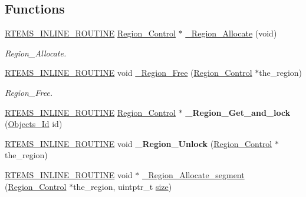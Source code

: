\subsection*{Functions}
\begin{DoxyCompactItemize}
\item 
\mbox{\hyperlink{group__RTEMSScoreBaseDefs_gac216239df231d5dbd15e3520b0b9313f}{R\+T\+E\+M\+S\+\_\+\+I\+N\+L\+I\+N\+E\+\_\+\+R\+O\+U\+T\+I\+NE}} \mbox{\hyperlink{structRegion__Control}{Region\+\_\+\+Control}} $\ast$ \mbox{\hyperlink{group__ClassicRegionImpl_gab5bc70b27378683bf2e2e4cdef8d7417}{\+\_\+\+Region\+\_\+\+Allocate}} (void)
\begin{DoxyCompactList}\small\item\em Region\+\_\+\+Allocate. \end{DoxyCompactList}\item 
\mbox{\hyperlink{group__RTEMSScoreBaseDefs_gac216239df231d5dbd15e3520b0b9313f}{R\+T\+E\+M\+S\+\_\+\+I\+N\+L\+I\+N\+E\+\_\+\+R\+O\+U\+T\+I\+NE}} void \mbox{\hyperlink{group__ClassicRegionImpl_ga27b8c2e206200f0fc192b8454f046603}{\+\_\+\+Region\+\_\+\+Free}} (\mbox{\hyperlink{structRegion__Control}{Region\+\_\+\+Control}} $\ast$the\+\_\+region)
\begin{DoxyCompactList}\small\item\em Region\+\_\+\+Free. \end{DoxyCompactList}\item 
\mbox{\label{group__ClassicRegionImpl_ga6e24cf9c8095bbf5470a5ab6a469415c}} 
\mbox{\hyperlink{group__RTEMSScoreBaseDefs_gac216239df231d5dbd15e3520b0b9313f}{R\+T\+E\+M\+S\+\_\+\+I\+N\+L\+I\+N\+E\+\_\+\+R\+O\+U\+T\+I\+NE}} \mbox{\hyperlink{structRegion__Control}{Region\+\_\+\+Control}} $\ast$ {\bfseries \+\_\+\+Region\+\_\+\+Get\+\_\+and\+\_\+lock} (\mbox{\hyperlink{group__RTEMSScoreObject_ga5821f52a51072941bdd603e542d0863e}{Objects\+\_\+\+Id}} id)
\item 
\mbox{\label{group__ClassicRegionImpl_gad444e14f7e98c6e3bad390d9a5a91e6b}} 
\mbox{\hyperlink{group__RTEMSScoreBaseDefs_gac216239df231d5dbd15e3520b0b9313f}{R\+T\+E\+M\+S\+\_\+\+I\+N\+L\+I\+N\+E\+\_\+\+R\+O\+U\+T\+I\+NE}} void {\bfseries \+\_\+\+Region\+\_\+\+Unlock} (\mbox{\hyperlink{structRegion__Control}{Region\+\_\+\+Control}} $\ast$the\+\_\+region)
\item 
\mbox{\hyperlink{group__RTEMSScoreBaseDefs_gac216239df231d5dbd15e3520b0b9313f}{R\+T\+E\+M\+S\+\_\+\+I\+N\+L\+I\+N\+E\+\_\+\+R\+O\+U\+T\+I\+NE}} void $\ast$ \mbox{\hyperlink{group__ClassicRegionImpl_ga832ceefdcf5076c6aae60d4d0762a2e2}{\+\_\+\+Region\+\_\+\+Allocate\+\_\+segment}} (\mbox{\hyperlink{structRegion__Control}{Region\+\_\+\+Control}} $\ast$the\+\_\+region, uintptr\+\_\+t \mbox{\hyperlink{sun4u_2tte_8h_a245260f6f74972558f61b85227df5aae}{size}})

\end{DoxyCompactItemize}
